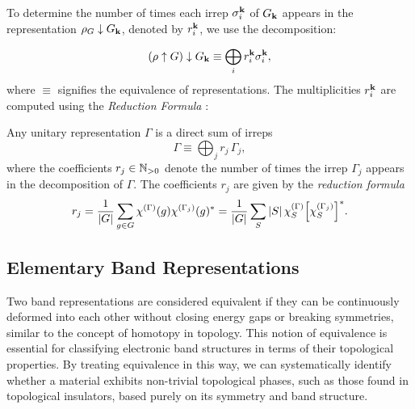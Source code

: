 \documentclass[12pt]{report}
\begin{document}
To determine the number of times each irrep \(\sigma_i^{\vb{k}}\) of \(G_{\vb{k}}\) appears in the representation \(\rho_G \downarrow G_{\vb{k}}\), denoted by \(r_i^{\vb{k}}\), we use the decomposition:

\begin{equation} \label{eq:induce_subduce}
(\rho \uparrow G) \downarrow G_{\vb{k}} \equiv \bigoplus_i r_i^{\vb{k}} \sigma_i^{\vb{k}},
\end{equation}
where \(\equiv\) signifies the equivalence of representations. The multiplicities \(r_i^{\vb{k}}\) are computed using the \textit{Reduction Formula} \cite{dresselhaus}:

\begin{theorem} \label{th:reduction_formula}
Any unitary representation $\Gamma$ is a direct sum of irreps
\begin{equation} \label{eq:Gamma_direct_sum_of_irreps}
\Gamma \equiv \bigoplus_j r_j \, \Gamma_j,
\end{equation}
where the coefficients $r_j \in {\mathbb{N}}_{>0}$ denote the number of times the irrep $\Gamma_j$ appears in the decomposition of $\Gamma$. The coefficients $r_j$ are given by the \textit{reduction formula}
\begin{equation} \label{eq:reduction_formula}
r_j =
\frac{1}{\abs{G}} \sum_{g \in G} \chi^{(\Gamma)}(g) \chi^{(\Gamma_j)}(g)^* =
\frac{1}{\abs{G}} \sum_{S} \abs{S} \, \chi^{(\Gamma)}_S \qty[\chi^{(\Gamma_j)}_S]^*.
\end{equation}
\end{theorem}

\subsection{Elementary Band Representations} \label{subsec:elementary_band_reps}

Two band representations are considered equivalent if they can be continuously deformed into each other without closing energy gaps or breaking symmetries, similar to the concept of homotopy in topology. This notion of equivalence is essential for classifying electronic band structures in terms of their topological properties. By treating equivalence in this way, we can systematically identify whether a material exhibits non-trivial topological phases, such as those found in topological insulators, based purely on its symmetry and band structure.
\end{document}
